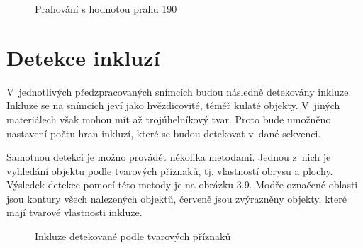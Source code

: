 \documentclass[12pt, a4paper]{report}
\begin{document}
	\begin{figure}[!htb]
	\centering
	\label{fig:prahovani_190}
	\caption{Prahování s hodnotou prahu 190}
	\end{figure}
	
	\section{Detekce inkluzí}
V~jednotlivých předzpracovaných snímcích budou následně detekovány inkluze. Inkluze se na snímcích jeví jako hvězdicovité, téměř kulaté objekty. V~jiných materiálech však mohou mít až trojúhelníkový tvar. Proto bude umožněno nastavení počtu hran inkluzí, které se budou detekovat v~dané sekvenci.

Samotnou detekci je možno provádět několika metodami. Jednou z~nich je vyhledání objektu podle tvarových příznaků, tj. vlastností obrysu a plochy. Výsledek detekce pomocí této metody je na obrázku 3.9. Modře označené oblasti jsou kontury všech nalezených objektů, červeně jsou zvýrazněny objekty, které mají tvarové vlastnosti inkluze.

\begin{figure}[!htb]
	\centering
	\label{fig:tvarove_priznaky}
	\caption{Inkluze detekované podle tvarových příznaků}
	\end{figure}
\end{document}
